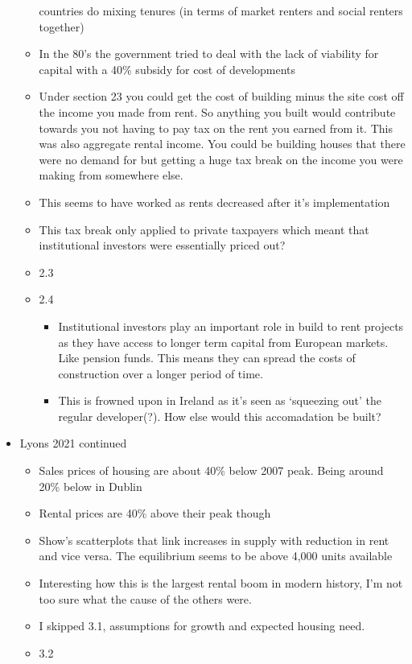 \documentclass[11pt]{article}
\begin{document}
\begin{itemize}
\begin{itemize}
    countries do mixing tenures (in terms of market renters and social
    renters together)
  \item
    In the 80's the government tried to deal with the lack of viability
    for capital with a 40\% subsidy for cost of developments
  \item
    Under section 23 you could get the cost of building minus the site
    cost off the income you made from rent. So anything you built would
    contribute towards you not having to pay tax on the rent you earned
    from it. This was also aggregate rental income. You could be
    building houses that there were no demand for but getting a huge tax
    break on the income you were making from somewhere else.
  \item
    This seems to have worked as rents decreased after it's
    implementation
  \item
    This tax break only applied to private taxpayers which meant that
    institutional investors were essentially priced out?
  \item
    2.3
  \item
    2.4

    \begin{itemize}
    \tightlist
    \item
      Institutional investors play an important role in build to rent
      projects as they have access to longer term capital from European
      markets. Like pension funds. This means they can spread the costs
      of construction over a longer period of time.
    \item
      This is frowned upon in Ireland as it's seen as `squeezing out'
      the regular developer(?). How else would this accomadation be
      built?
    \end{itemize}
  \end{itemize}
\item
  Lyons 2021 continued

  \begin{itemize}
  \tightlist
  \item
    Sales prices of housing are about 40\% below 2007 peak. Being around
    20\% below in Dublin
  \item
    Rental prices are 40\% above their peak though
  \item
    Show's scatterplots that link increases in supply with reduction in
    rent and vice versa. The equilibrium seems to be above 4,000 units
    available
  \item
    Interesting how this is the largest rental boom in modern history,
    I'm not too sure what the cause of the others were.
  \item
    I skipped 3.1, assumptions for growth and expected housing need.
  \item
    3.2


\end{itemize}
\end{itemize}
\end{document}
